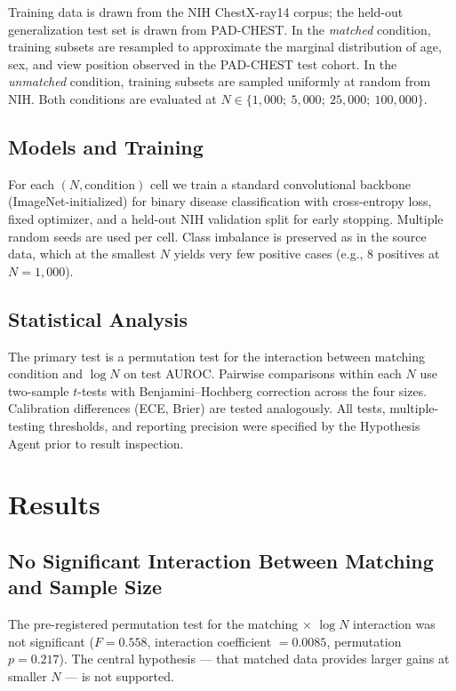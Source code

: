 \documentclass[11pt]{article}
\begin{document}
Training data is drawn from the NIH ChestX-ray14 corpus; the held-out generalization test set is drawn from PAD-CHEST. In the \emph{matched} condition, training subsets are resampled to approximate the marginal distribution of age, sex, and view position observed in the PAD-CHEST test cohort. In the \emph{unmatched} condition, training subsets are sampled uniformly at random from NIH. Both conditions are evaluated at $N \in \{1{,}000;\ 5{,}000;\ 25{,}000;\ 100{,}000\}$.

\subsection{Models and Training}

For each $(N, \text{condition})$ cell we train a standard convolutional backbone (ImageNet-initialized) for binary disease classification with cross-entropy loss, fixed optimizer, and a held-out NIH validation split for early stopping. Multiple random seeds are used per cell. Class imbalance is preserved as in the source data, which at the smallest $N$ yields very few positive cases (e.g., 8 positives at $N=1{,}000$).

\subsection{Statistical Analysis}

The primary test is a permutation test for the interaction between matching condition and $\log N$ on test AUROC. Pairwise comparisons within each $N$ use two-sample $t$-tests with Benjamini--Hochberg correction across the four sizes. Calibration differences (ECE, Brier) are tested analogously. All tests, multiple-testing thresholds, and reporting precision were specified by the Hypothesis Agent prior to result inspection.

\section{Results}

\subsection{No Significant Interaction Between Matching and Sample Size}

The pre-registered permutation test for the matching $\times$ $\log N$ interaction was not significant ($F = 0.558$, interaction coefficient $= 0.0085$, permutation $p = 0.217$). The central hypothesis --- that matched data provides larger gains at smaller $N$ --- is not supported.
\end{document}

